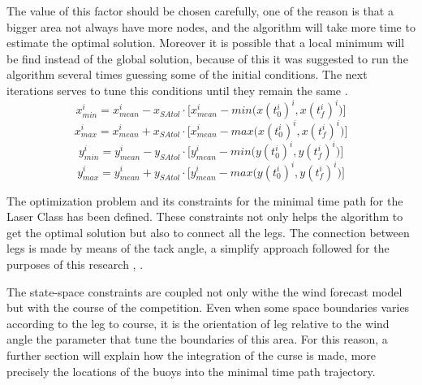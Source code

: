  The value of this factor should be chosen carefully, one of the reason is that a bigger area not always have more nodes, and the algorithm will take more time to estimate the optimal solution. Moreover it is possible that a local minimum will be find instead of the global solution, because of this it was suggested to run the algorithm several times  guessing some of the initial conditions. The next iterations serves to tune this conditions until they remain the same \cite{philpott1993yacht}. %
\begin{equation} \label{eq:Xmin_SailArea}
    x_{min}^{i}=x_{mean}^{i} - x_{SAtol}\cdot \Bigg[ x_{mean}^{i} -  min \bigg( x(t_{0}^{i})^{i},x(t_{f}^{i})^{i} \bigg) \Bigg]
\end{equation}
\begin{equation} \label{eq:Xmax_SailArea}
    x_{max}^{i}=x_{mean}^{i} + x_{SAtol}\cdot \Bigg[ x_{mean}^{i} -  max \bigg( x(t_{0}^{i})^{i},x(t_{f}^{i})^{i} \bigg) \Bigg]
\end{equation}
\begin{equation} \label{eq:Ymin_SailArea}
    y_{min}^{i}=y_{mean}^{i} - y_{SAtol}\cdot \Bigg[ y_{mean}^{i} -  min \bigg( y(t_{0}^{i})^{i},y(t_{f}^{i})^{i} \bigg) \Bigg]
\end{equation}
\begin{equation} \label{eq:Ymax_SailArea}
    y_{max}^{i} = y_{mean}^{i} + y_{SAtol}\cdot \Bigg[ y_{mean}^{i} -  max \bigg( y(t_{0}^{i})^{i},y(t_{f}^{i})^{i} \bigg) \Bigg]
\end{equation}

The optimization problem and its constraints for the minimal time path for the Laser Class has been defined. These constraints not only helps the algorithm to get the optimal solution but also to connect all the legs. The connection between legs is made by means of the tack angle, a simplify approach followed for the purposes of this research \cite{jouffroy2009steering}, \cite{LinXiao2011ModelingYachts}.\par 
The state-space constraints are coupled not only withe the wind forecast model but with the course of the competition. Even when some space boundaries varies according to the leg to course, it is the orientation of leg relative to the wind angle the parameter that tune the boundaries of this area. For this reason, a further section will explain how the integration of the curse is made, more precisely the locations of the buoys into the minimal time path trajectory.\par 

